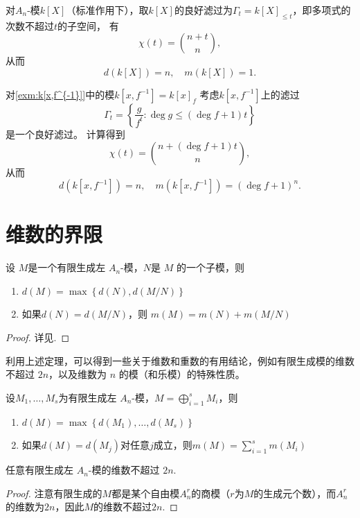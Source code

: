 \documentclass[12pt,a4paper]{ctexrep}   %
\begin{document}
\begin{example}
    对$A_n$-模$k[X]$（标准作用下），取$k[X]$的良好滤过为$\Gamma_t=k[X]_{\le t}$，即多项式的次数不超过$t$的子空间，
    有
    \begin{equation*}
        \chi(t)=\binom{n+t}{n},
    \end{equation*}
    从而
    \begin{equation*}
        d(k[X])=n,
        \quad
        m(k[X])=1.
    \end{equation*}
\end{example}

\begin{example}
    对\ref{exm:k[x,f^{-1}]}中的模$k[x,f^{-1}]=k[x]_{f}$
    考虑$k[x,f^{-1}]$上的滤过
    \begin{equation*}
        \Gamma_t=\left\{\frac{g}{f^t}:\deg g \leq (\deg f +1)t\right\}
    \end{equation*}
    是一个良好滤过。
    计算得到
    \begin{equation*}
        \chi(t)=\binom{n+(\deg f +1)t}{n},
    \end{equation*}
    从而 \begin{equation*}
        d(k[x,f^{-1}])=n,
        \quad
        m(k[x,f^{-1}])=(\deg f +1)^n.
    \end{equation*}
\end{example}

\section{维数的界限}
\begin{theorem}
    \label{thm:Dimension}
    设 $M$是一个有限生成左 $A_n$-模，$N$是 $M$ 的一个子模，则
    \begin{enumerate}
        \item
              $ d(M)=\max\left\{d(N),d(M/N)\right\}$
        \item
              如果$d(N)=d(M/N)$，则 $m(M)=m(N)+m(M/N)$
    \end{enumerate}
\end{theorem}
\begin{proof}
    详见\cite{coutinho1995primer}.
\end{proof}
利用上述定理，可以得到一些关于维数和重数的有用结论，例如有限生成模的维数不超过 $2n$，以及维数为 $n$ 的模（和乐模）的特殊性质。
\begin{corollary}
    设$M_1,\dots,M_s$为有限生成左 $A_n$-模，$M=\bigoplus_{i=1}^s M_i$，则
    \begin{enumerate}
        \item $d(M)=\max\left\{d(M_1),\dots,d(M_s)\right\}$
        \item 如果$d(M)=d(M_j)$对任意$j$成立，则$m(M)=\sum_{i=1}^s m(M_i)$
    \end{enumerate}
\end{corollary}
\begin{corollary}
    任意有限生成左 $A_n$-模的维数不超过 $2n$.
    \begin{proof}
        注意有限生成的$M$都是某个自由模$A_n^r$的商模（$r$为$M$的生成元个数），而$A_n^r$的维数为$2n$，因此$M$的维数不超过$2n$.
    \end{proof}
\end{corollary}
\end{document}

